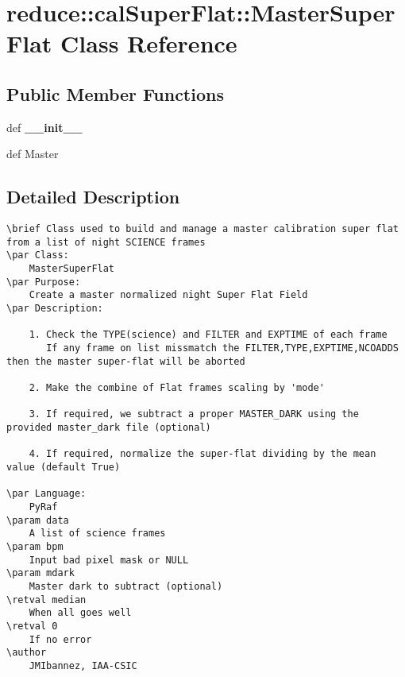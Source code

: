 \section{reduce::cal\-Super\-Flat::Master\-Super\-Flat Class Reference}
\label{classreduce_1_1calSuperFlat_1_1MasterSuperFlat}
\subsection*{Public Member Functions}
\begin{CompactItemize}
\item 
def {\bf\_\-\_\-init\_\-\_\-}
\item 
def {\bfcreate\-Master}
\end{CompactItemize}


\subsection{Detailed Description}


\footnotesize\begin{verbatim}
\brief Class used to build and manage a master calibration super flat from a list of night SCIENCE frames
\par Class:
    MasterSuperFlat
\par Purpose:
    Create a master normalized night Super Flat Field
\par Description:
    
    1. Check the TYPE(science) and FILTER and EXPTIME of each frame
       If any frame on list missmatch the FILTER,TYPE,EXPTIME,NCOADDS then the master super-flat will be aborted
    
    2. Make the combine of Flat frames scaling by 'mode'
    
    3. If required, we subtract a proper MASTER_DARK using the provided master_dark file (optional)

    4. If required, normalize the super-flat dividing by the mean value (default True)
    
\par Language:
    PyRaf
\param data
    A list of science frames
\param bpm
    Input bad pixel mask or NULL
\param mdark
    Master dark to subtract (optional)
\retval median
    When all goes well
\retval 0
    If no error
\author
    JMIbannez, IAA-CSIC
\end{verbatim}
\normalsize
 



